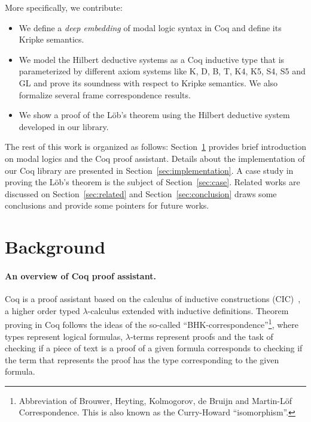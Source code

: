 \documentclass[sigconf,anonymous]{acmart}
\begin{document}

More specifically, we contribute:

\begin{itemize}
  \item We define a \emph{deep embedding} of modal logic syntax in Coq and
    define its Kripke semantics.
  \item We model the Hilbert deductive systems as a Coq inductive type that is
    parameterized by different axiom systems like K, D, B, T, K4, K5, S4, S5 and GL
    and prove its soundness with respect to Kripke semantics.
    We also formalize several frame correspondence results.
  \item We show a proof of the L\"ob's theorem using the Hilbert deductive system
    developed in our library.
\end{itemize}

The rest of this work is organized as follows: Section~\ref{sec:background} provides
brief introduction on modal logics and the Coq proof assistant. Details about
the implementation of our Coq library are presented in
Section~\ref{sec:implementation}. A case study in proving the L\"ob's theorem is
the subject of Section~\ref{sec:case}. Related works are discussed
on Section~\ref{sec:related} and Section~\ref{sec:conclusion} draws some conclusions and
provide some pointers for future works.

\section{Background}\label{sec:background}

\paragraph{An overview of Coq proof assistant.}

Coq is a proof assistant based on the calculus of inductive
constructions (CIC)~\cite{manual_cic}, a higher order typed
$\lambda$-calculus extended with inductive definitions.  Theorem
proving in Coq follows the ideas of the so-called
``BHK-cor\-res\-pon\-dence''\footnote{Abbreviation of Brouwer, Heyting,
  Kolmogorov, de Bruijn and Martin-L\"of Correspondence. This is also
  known as the Curry-Howard ``isomorphism''.}, where types represent
logical formulas, $\lambda$-terms represent proofs
\cite{Bertot10} and the task of checking if a piece of text is a
proof of a given formula corresponds to checking if the term that
represents the proof has the type corresponding to the given formula.
\end{document}
